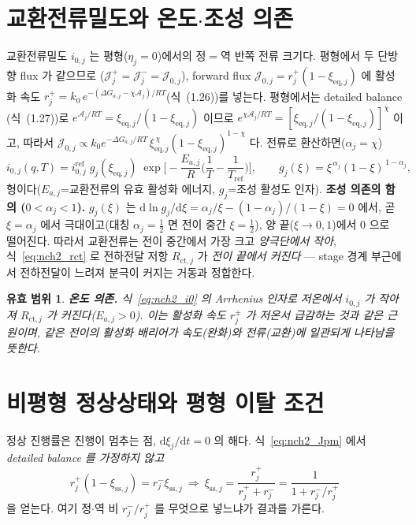 \documentclass[11pt,a4paper]{article}
\newtheorem*{boundbox}{유효 범위}
\newcommand{\dd}{\mathrm{d}}
\newcommand{\eq}{\mathrm{eq}}
\newcommand{\sstat}{\mathrm{ss}}
\newcommand{\ct}{\mathrm{ct}}
\begin{document}
\section{교환전류밀도와 온도$\cdot$조성 의존}\label{sec:nch2_i0}
교환전류밀도 $i_{0,j}$ 는 평형($\eta_j=0$)에서의 정$=$역 반쪽 전류 크기다. 평형에서 두 단방향 flux 가 같으므로
($\mathcal J_j^+=\mathcal J_j^-=\mathcal J_{0,j}$), forward flux $\mathcal J_{0,j}=r_j^+(1-\xi_{\eq,j})$ 에 활성화
속도 $r_j^+=k_0\,e^{-(\Delta G_{a,j}-\chi\mathcal A_j)/RT}$(식~(1.26))를 넣는다. 평형에서는 detailed balance
(식~(1.27))로 $e^{\mathcal A_j/RT}=\xi_{\eq,j}/(1-\xi_{\eq,j})$ 이므로 $e^{\chi\mathcal A_j/RT}=[\xi_{\eq,j}
/(1-\xi_{\eq,j})]^{\chi}$ 이고, 따라서 $\mathcal J_{0,j}\propto k_0e^{-\Delta G_{a,j}/RT}\,\xi_{\eq,j}^{\,\chi}
(1-\xi_{\eq,j})^{1-\chi}$ 다. 전류로 환산하면($\alpha_j=\chi$)
\begin{equation}
i_{0,j}(q,T)=i_{0,j}^{\mathrm{ref}}\;g_j(\xi_{\eq,j})\;\exp\!\Big[-\frac{E_{a,j}}{R}\Big(\frac1T-\frac1{T_{\mathrm{ref}}}\Big)\Big],
\qquad g_j(\xi)=\xi^{\,\alpha_j}(1-\xi)^{\,1-\alpha_j},
\label{eq:nch2_i0}
\end{equation}
형이다($E_{a,j}$=교환전류의 유효 활성화 에너지, $g_j$=조성 활성도 인자). \textbf{조성 의존의 함의
($0<\alpha_j<1$).} $g_j(\xi)$ 는 $\dd\ln g_j/\dd\xi=\alpha_j/\xi-(1-\alpha_j)/(1-\xi)=0$ 에서, 곧 $\xi=\alpha_j$
에서 극대이고(대칭 $\alpha_j=\tfrac12$ 면 전이 중간 $\xi=\tfrac12$), 양 끝($\xi\to0,1$)에서 $0$ 으로 떨어진다. 따라서
교환전류는 전이 중간에서 가장 크고 \emph{양극단에서 작아}, 식~\eqref{eq:nch2_rct} 로 전하전달 저항 $R_{\ct,j}$ 가
\emph{전이 끝에서 커진다} — stage 경계 부근에서 전하전달이 느려져 분극이 커지는 거동과 정합한다.
\begin{boundbox}
\textbf{온도 의존.} 식~\eqref{eq:nch2_i0} 의 Arrhenius 인자로 저온에서 $i_{0,j}$ 가 작아져 $R_{\ct,j}$ 가
커진다($E_{a,j}>0$). 이는 활성화 속도 $r_j^\pm$ 가 저온서 급감하는 것과 같은 근원이며, 같은 전이의 활성화
배리어가 \emph{속도}(완화)와 \emph{전류}(교환)에 일관되게 나타남을 뜻한다.
\end{boundbox}

\section{비평형 정상상태와 평형 이탈 조건}\label{sec:nch2_ss}
정상 진행률은 진행이 멈추는 점, $\dd\xi_j/\dd t=0$ 의 해다. 식~\eqref{eq:nch2_Jpm} 에서 \emph{detailed balance 를
가정하지 않고}
\begin{equation}
r_j^+(1-\xi_{\sstat,j})=r_j^-\xi_{\sstat,j}\ \Longrightarrow\
\xi_{\sstat,j}=\frac{r_j^+}{r_j^++r_j^-}=\frac{1}{1+r_j^-/r_j^+}
\label{eq:nch2_xiss}
\end{equation}
을 얻는다. 여기 정$\cdot$역 비 $r_j^-/r_j^+$ 를 무엇으로 넣느냐가 결과를 가른다.
\end{document}
